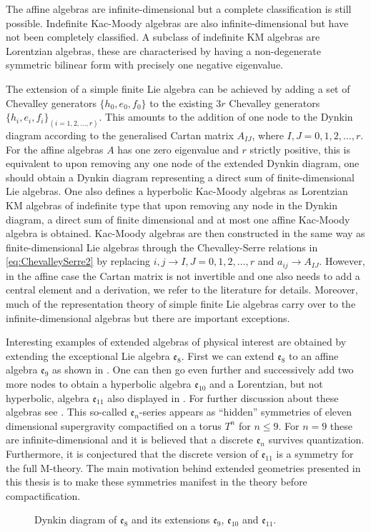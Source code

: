 The affine algebras are infinite-dimensional but a complete classification is still possible. Indefinite Kac-Moody algebras are also infinite-dimensional but have not been completely classified. A subclass of indefinite KM algebras are Lorentzian algebras, these are characterised by having a non-degenerate symmetric bilinear form with precisely one negative eigenvalue. 

The extension of a simple finite Lie algebra can be achieved by adding a set of Chevalley generators $\{h_0,e_0,f_0\}$ to the existing $3r$ Chevalley generators $\{h_i,e_i,f_i\}_{(i=1,2,\ldots,r)}$. This amounts to the addition of one node to the Dynkin diagram according to the generalised Cartan matrix $A_{IJ}$, where $I,J=0,1,2,\ldots, r$. For the affine algebras $A$ has one zero eigenvalue and $r$ strictly positive, this is equivalent to upon removing any one node of the extended Dynkin diagram, one should obtain a Dynkin diagram representing a direct sum of finite-dimensional Lie algebras. One also defines a hyperbolic Kac-Moody algebras as Lorentzian KM algebras of indefinite type that upon removing any node in the Dynkin diagram, a direct sum of finite dimensional and at most one affine Kac-Moody algebra is obtained. Kac-Moody algebras are then constructed in the same way as finite-dimensional Lie algebras through the Chevalley-Serre relations in \eqref{eq:ChevalleySerre2} by replacing $i,j\to I,J=0,1,2,\ldots,r$ and $a_{ij}\to A_{IJ}$. However, in the affine case the Cartan matrix is not invertible and one also needs to add a central element and a derivation, we refer to the literature for details. Moreover, much of the representation theory of simple finite Lie algebras carry over to the infinite-dimensional algebras but there are important exceptions. 

Interesting examples of extended algebras of physical interest are obtained by extending the exceptional Lie algebra $\mathfrak{e}_8$. First we can extend $\mathfrak{e}_8$ to an affine algebra $\mathfrak{e}_9$ as shown in . One can then go even further and successively add two more nodes to obtain a hyperbolic algebra $\mathfrak{e}_{10}$ and a Lorentzian, but not hyperbolic, algebra $\mathfrak{e}_{11}$ also displayed in . For further discussion about these algebras see \cite{PhdJakob2009,PhdDaniel2010}. This so-called $\mathfrak{e}_n$-series appears as ``hidden'' symmetries of eleven dimensional supergravity compactified on a torus $T^n$ for $n\leq 9$. For $n=9$ these are infinite-dimensional and it is believed that a discrete $\mathfrak{e}_n$ survives quantization. Furthermore, it is conjectured \cite{West2011} that the discrete version of $\mathfrak{e}_{11}$ is a symmetry for the full M-theory. The main motivation behind extended geometries presented in this thesis is to make these symmetries manifest in the theory before compactification. 
\begin{figure}
    \caption{Dynkin diagram of $\mathfrak{e}_8$ and its extensions $\mathfrak{e}_9$, $\mathfrak{e}_{10}$ and $\mathfrak{e}_{11}$.}
    \label{fig:DynkinEseries}
\end{figure}

